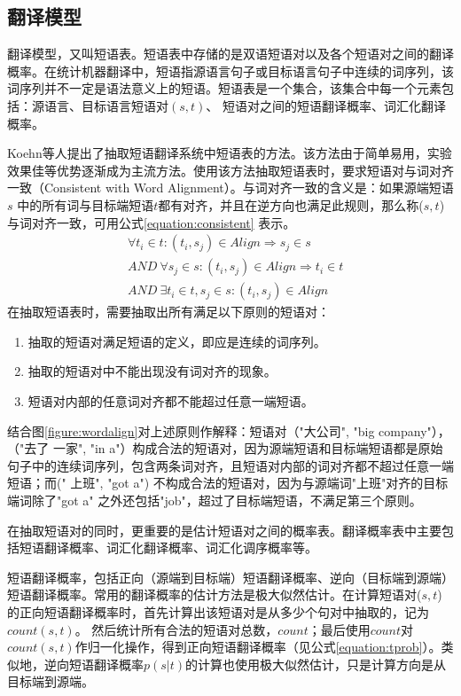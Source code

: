 \documentclass[master, winfont]{njuthesis}
\begin{document}
\subsection{翻译模型}\label{section:tmextract}
翻译模型，又叫短语表。短语表中存储的是双语短语对以及各个短语对之间的翻译概率\cite{marcu2002phrase}。在统计机器翻译中，短语指源语言句子或目标语言句子中连续的词序列，该词序列并不一定是语法意义上的短语。短语表是一个集合，该集合中每一个元素包括：源语言、目标语言短语对$(s,t)$、 短语对之间的短语翻译概率、词汇化翻译概率。

Koehn等人\cite{koehn2003statistical,koehn2009statistical}提出了抽取短语翻译系统中短语表的方法。该方法由于简单易用，实验效果佳等优势逐渐成为主流方法。使用该方法抽取短语表时，要求短语对与词对齐一致（Consistent with Word Alignment）。与词对齐一致的含义是：如果源端短语$s$ 中的所有词与目标端短语$t$都有对齐，并且在逆方向也满足此规则，那么称($s, t$) 与词对齐一致，可用公式\ref{equation:consistent} 表示。
\begin{equation}
  \label{equation:consistent}
  \begin{aligned}
    &\forall t_i \in t: (t_i, s_j) \in Align \Rightarrow s_j \in s \\
   &AND~\forall s_j \in s: (t_i, s_j) \in Align \Rightarrow t_i \in t \\
   &AND~\exists t_i\in t, s_j \in s: (t_i, s_j) \in Align
  \end{aligned}
\end{equation}
在抽取短语表时，需要抽取出所有满足以下原则的短语对：
\begin{enumerate}
  \item 抽取的短语对满足短语的定义，即应是连续的词序列。
  \item 抽取的短语对中不能出现没有词对齐的现象。
  \item 短语对内部的任意词对齐都不能超过任意一端短语。
\end{enumerate}

结合图\ref{figure:wordalign}对上述原则作解释：短语对（"大公司", "big company"），（"去了 一家", "in a"）构成合法的短语对，因为源端短语和目标端短语都是原始句子中的连续词序列，包含两条词对齐，且短语对内部的词对齐都不超过任意一端短语；而(" 上班", "got a") 不构成合法的短语对，因为与源端词"上班"对齐的目标端词除了"got a" 之外还包括"job"，超过了目标端短语，不满足第三个原则。

在抽取短语对的同时，更重要的是估计短语对之间的概率表。翻译概率表中主要包括短语翻译概率、词汇化翻译概率、词汇化调序概率等。

短语翻译概率，包括正向（源端到目标端）短语翻译概率、逆向（目标端到源端）短语翻译概率。常用的翻译概率的估计方法是极大似然估计。在计算短语对($s,t$)的正向短语翻译概率时，首先计算出该短语对是从多少个句对中抽取的，记为$count(s,t)$。 然后统计所有合法的短语对总数，$count$；最后使用$count$对$count(s, t)$作归一化操作，得到正向短语翻译概率（见公式\ref{equation:tprob}）。类似地，逆向短语翻译概率$p(s|t)$的计算也使用极大似然估计，只是计算方向是从目标端到源端。
\end{document}
